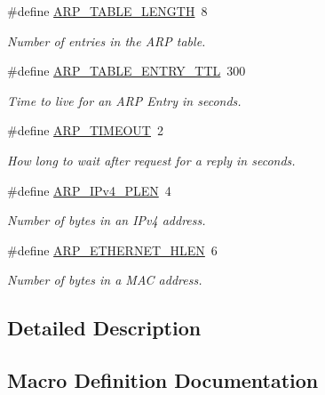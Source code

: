 \begin{DoxyCompactItemize}
\item 
\#define \mbox{\hyperlink{group__arp_gad4abd9ee89fa8a8ba4231b6d914b5e83}{A\+R\+P\+\_\+\+T\+A\+B\+L\+E\+\_\+\+L\+E\+N\+G\+TH}}~8
\begin{DoxyCompactList}\small\item\em Number of entries in the A\+RP table. \end{DoxyCompactList}\item 
\#define \mbox{\hyperlink{group__arp_ga9b6d09f1eb065d812b3cdb5f6cc2f68d}{A\+R\+P\+\_\+\+T\+A\+B\+L\+E\+\_\+\+E\+N\+T\+R\+Y\+\_\+\+T\+TL}}~300
\begin{DoxyCompactList}\small\item\em Time to live for an A\+RP Entry in seconds. \end{DoxyCompactList}\item 
\#define \mbox{\hyperlink{group__arp_gacadcd25bea19657185a5fcb4f65a7669}{A\+R\+P\+\_\+\+T\+I\+M\+E\+O\+UT}}~2
\begin{DoxyCompactList}\small\item\em How long to wait after request for a reply in seconds. \end{DoxyCompactList}\item 
\#define \mbox{\hyperlink{group__arp_gaf171df407fe6f40b73e3d6d7407a994f}{A\+R\+P\+\_\+\+I\+Pv4\+\_\+\+P\+L\+EN}}~4
\begin{DoxyCompactList}\small\item\em Number of bytes in an I\+Pv4 address. \end{DoxyCompactList}\item 
\#define \mbox{\hyperlink{group__arp_ga2fda3c8f5c96e205a993efb5cfb4f297}{A\+R\+P\+\_\+\+E\+T\+H\+E\+R\+N\+E\+T\+\_\+\+H\+L\+EN}}~6
\begin{DoxyCompactList}\small\item\em Number of bytes in a M\+AC address. \end{DoxyCompactList}\end{DoxyCompactItemize}


\subsection{Detailed Description}


\subsection{Macro Definition Documentation}
\mbox{\label{group__arp_ga2fda3c8f5c96e205a993efb5cfb4f297}} 
